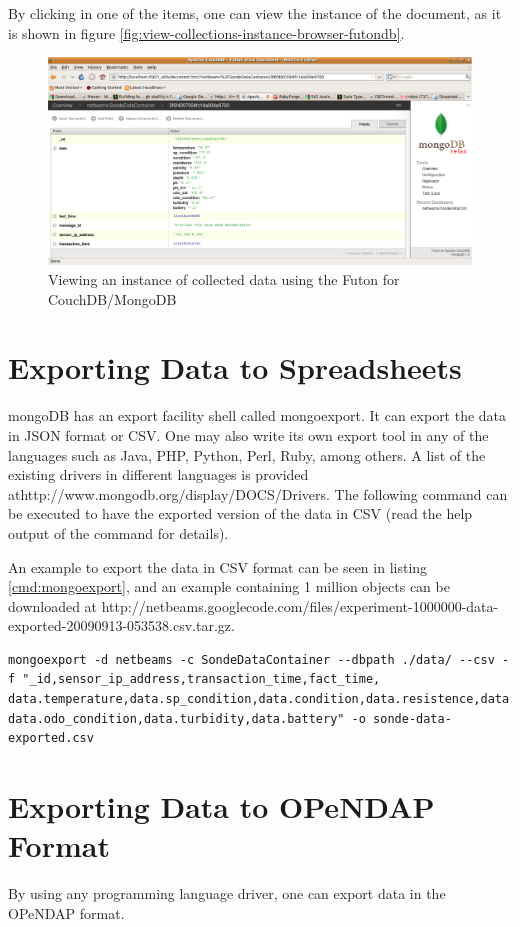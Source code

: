 By clicking in one of the items, one can view the instance of the document, as
it is shown in figure \ref{fig:view-collections-instance-browser-futondb}.

\begin{figure}[h]
  \centering
  \includegraphics[scale=0.3]{../diagrams/view-collected-data-instance-browser-futondb}
  \caption{Viewing an instance of collected data using the Futon for
  CouchDB/MongoDB}
  \label{fig:view-collected-data-instance-browser-futondb}
\end{figure}

\section{Exporting Data to Spreadsheets}

mongoDB has an export facility shell called mongoexport. It can export the data
in JSON format or CSV. One may also write its own export tool in any of the
languages such as Java, PHP, Python, Perl, Ruby, among others. A list of the
existing drivers in different languages is provided
athttp://www.mongodb.org/display/DOCS/Drivers. The following command can be
executed to have the exported version of the data in CSV (read the help output
of the command for details).

An example to export the data in CSV format can be seen in listing
\ref{cmd:mongoexport}, and an example containing 1 million objects can be
downloaded at
http://netbeams.googlecode.com/files/experiment-1000000-data-exported-20090913-053538.csv.tar.gz.

\lstset{label=cmd:mongoexport,caption=Command to export data in CSV format}
\begin{lstlisting}
mongoexport -d netbeams -c SondeDataContainer --dbpath ./data/ --csv -f "_id,sensor_ip_address,transaction_time,fact_time,
data.temperature,data.sp_condition,data.condition,data.resistence,data.salinitude,data.pressure,data.depth,data.ph,data.pH_mv,data.odo_sat,
data.odo_condition,data.turbidity,data.battery" -o sonde-data-exported.csv
\end{lstlisting}

\section{Exporting Data to OPeNDAP Format}

By using any programming language driver, one can export data in the OPeNDAP
format.